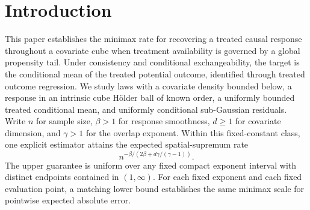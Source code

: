 \begin{abstract}
We characterize minimax recovery of the treated causal response under a global propensity-tail restriction. The model combines consistency and conditional exchangeability with a covariate density bounded below on a cube, intrinsic Hölder response smoothness of known order \(\beta>1\), a bounded treated conditional mean, and uniformly conditional sub-Gaussian residuals. If \(d\) is the covariate dimension, \(n\) is the sample size, and \(\gamma>1\) is the overlap exponent, the pointwise and expected spatial-supremum minimax risks have scale
\[
n^{-\beta/(2\beta+d\gamma/(\gamma-1))}.
\]
An explicit estimator fits local polynomials with equal aggregate weight across fixed template microcells and selects its mesh through treated observation counts. With model constants fixed, its expected spatial-supremum guarantee attains this pure-power rate uniformly over fixed compact overlap intervals with distinct endpoints in \((1,\infty)\), using the known smoothness and observed treatment design. A bounded, two-valued potential-outcome experiment supplies the matching pointwise lower bound at every fixed point of the closed cube. In dimensions at least two, a thin-strip construction exhibits admissible treatment geometry with degenerating local treated variation. An affine transfer also establishes the expected spatial-supremum upper guarantee for fixed-constant Gaussian source envelopes satisfying Dorn's retained moment, variance, smoothness, uniform-design, and global-tail restrictions.
\end{abstract}

\section{Introduction}

This paper establishes the minimax rate for recovering a treated causal response throughout a covariate cube when treatment availability is governed by a global propensity tail. Under consistency and conditional exchangeability, the target is the conditional mean of the treated potential outcome, identified through treated outcome regression. We study laws with a covariate density bounded below, a response in an intrinsic cube Hölder ball of known order, a uniformly bounded treated conditional mean, and uniformly conditional sub-Gaussian residuals. Write \(n\) for sample size, \(\beta>1\) for response smoothness, \(d\ge1\) for covariate dimension, and \(\gamma>1\) for the overlap exponent. Within this fixed-constant class, one explicit estimator attains the expected spatial-supremum rate
\[
n^{-\beta/(2\beta+d\gamma/(\gamma-1))}.
\]
The upper guarantee is uniform over any fixed compact exponent interval with distinct endpoints contained in \((1,\infty)\). For each fixed exponent and each fixed evaluation point, a matching lower bound establishes the same minimax scale for pointwise expected absolute error.

